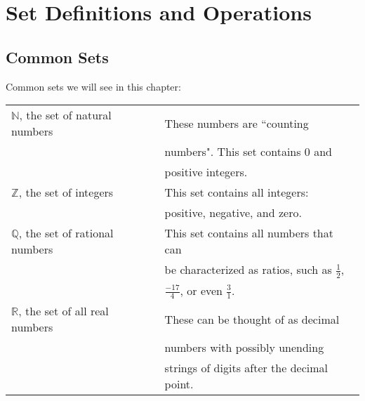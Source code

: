 \documentclass[a4paper,12pt]{book}
\title{}
\author{Rachel Morris}
\date{\today}
\begin{document}
    \togglefalse{answerkey}


    \section{Set Definitions and Operations}

    \subsection{Common Sets}

        \begin{intro}{Common sets we will see in this chapter:}
            \begin{tabular}{l l}
                $\mathbb{N}$, the set of natural numbers &
                These numbers are ``counting
                \\ & numbers".
                This set contains 0 and
                \\ & positive integers.

                \\
                $\mathbb{Z}$, the set of integers &
                This set contains all integers:
                \\ & positive, negative, and zero.
                \\
                $\mathbb{Q}$, the set of rational numbers &
                This set contains all numbers that can
                \\ &  be characterized
                as ratios, such as $\frac{1}{2}$,
                \\ & $\frac{-17}{4}$,
                or even $\frac{3}{1}$.
                \\
                $\mathbb{R}$, the set of all real numbers &
                These can be thought of as decimal
                \\ & numbers with possibly
                unending
                \\ & strings of digits after
                the decimal point.
            \end{tabular}
        \end{intro}
\end{document}
